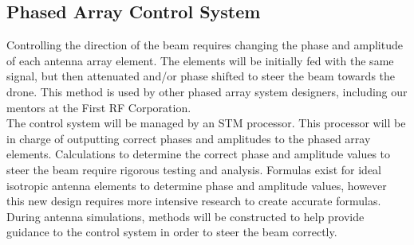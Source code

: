 \documentclass[UROP.tex]{subfiles}
\begin{document}
\subsection{Phased Array Control System}

	Controlling the direction of the beam requires changing the phase and amplitude of each antenna array element.  The elements will be initially fed with the same signal, but then attenuated and/or phase shifted to steer the beam towards the drone.  This method is used by other phased array system designers, including our mentors at the First RF Corporation.  \\
	
	The control system will be managed by an STM processor.  This processor will be in charge of outputting correct phases and amplitudes to the phased array elements.  Calculations to determine the correct phase and amplitude values to steer the beam require rigorous testing and analysis.  Formulas exist for ideal isotropic antenna elements to determine phase and amplitude values, however this new design requires more intensive research to create accurate formulas.  During antenna simulations, methods will be constructed to help provide guidance to the control system in order to steer the beam correctly. \\
	
\end{document}
